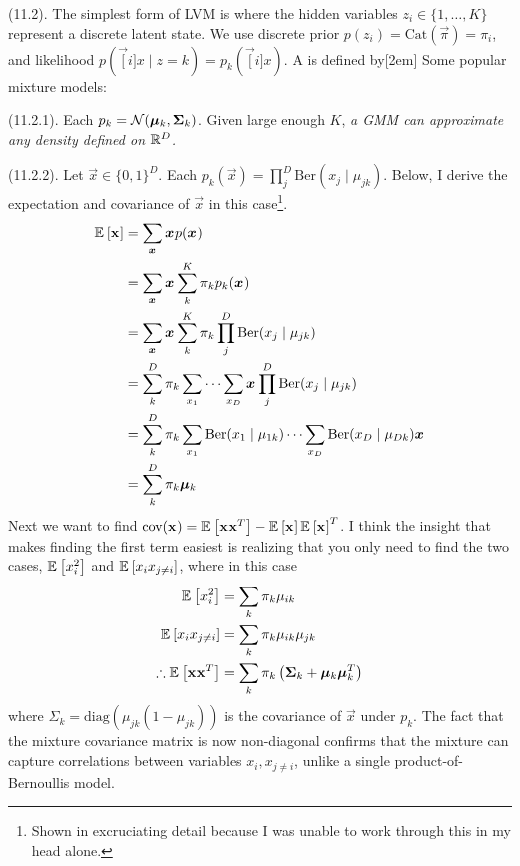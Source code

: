\documentclass[11pt]{article}
\begin{document}
\myspace
\p {} (11.2). The simplest form of LVM is where the hidden variables $z_i \in \{1, \ldots, K\}$ represent a discrete latent state. We use discrete prior $p(z_i) = \text{Cat}(\vec\pi) = \pi_i$, and likelihood $p(\vec[i]{x} \mid z{=}k) = p_k(\vec[i]{x})$. A  is defined by[2em]
Some popular mixture models:
\begin{compactitem}
	\item {} (11.2.1). Each $p_k = \mathcal{N}(\vec[k]{\mu}, \matr[k]{\Sigma})$. Given large enough $K$, \textit{a GMM can approximate any density defined on $\R^D$.}
	
	\item {} (11.2.2). Let $\vec x \in \{0, 1\}^D$. Each $p_k(\vec x) = \prod_j^D \text{Ber}(x_j \mid \mu_{jk})$. Below, I derive the expectation and covariance of $\vec x$ in this case\footnote{Shown in excruciating detail because I was unable to work through this in my head alone.}. 
	\begin{align}
		\E{\rvec x}
			&= \sum_{\vec x} \vec{x} p(\vec x) \\
			&= \sum_{\vec x} \vec{x} \sum_k^K \pi_k p_k(\vec x) \\
			&= \sum_{\vec x} \vec{x} \sum_k^K \pi_k \prod_{j}^{D} \text{Ber}(x_j\mid \mu_{jk}) \\
			&= \sum_k^{D} \pi_k \sum_{x_1} \cdots \sum_{x_D} \vec x \prod_j^D \text{Ber}(x_j\mid \mu_{jk}) \\
			&= \sum_k^{D} \pi_k \sum_{x_1} \text{Ber}(x_1 \mid \mu_{1k}) \cdots \sum_{x_D} \text{Ber}(x_D \mid \mu_{Dk}) \vec x \\
			&= \sum_k^{D} \pi_k \vec[k]{\mu} 
	\end{align}
	Next we want to find $\text{cov}(\rvec x) = \E{\rvec{x}\rvec{x}^T} - \E{\rvec x}\E{\rvec{x}}^T$. I think the insight that makes finding the first term easiest is realizing that you only need to find the two cases, $\E{x_i^2}$ and $\E{x_i x_{j\ne i}}$, where in this case
	\begin{align}
		\E{x_i^2} &= \sum_k \pi_k \mu_{ik} \\
		\E{x_i x_{j \ne i}} &= \sum_k \pi_k \mu_{ik} \mu_{jk} \\
		\therefore \E{\rvec x \rvec{x}^T}
			&= \sum_k \pi_k \left( \matr[k]{\Sigma} + \vec[k]{\mu} \vec[k]{\mu}^T  \right)
	\end{align}
	where $\Sigma_k = \text{diag}(\mu_{jk}(1- \mu_{jk}))$ is the covariance of $\vec x$ under $p_k$. The fact that the mixture covariance matrix is now non-diagonal confirms that the mixture can capture correlations between variables $x_i, x_{j\ne i}$, unlike a single product-of-Bernoullis model.
	
\end{compactitem}
\end{document}
